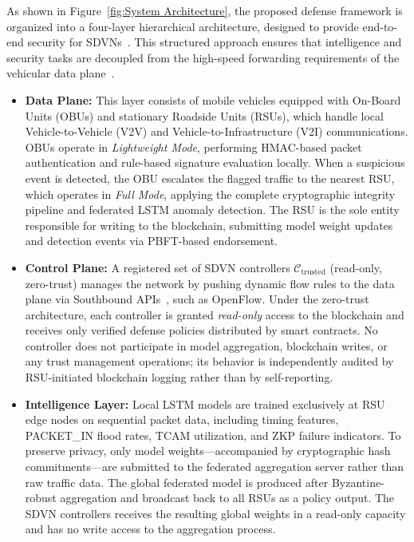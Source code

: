 \documentclass[12pt, a4paper]{report}
\begin{document}
As shown in Figure~\ref{fig:System Architecture}, the proposed defense framework 
is organized into a four-layer hierarchical architecture, designed to provide 
end-to-end security for SDVNs~\cite{Cardona_2020, s23031600}. This structured 
approach ensures that intelligence and security tasks are decoupled from the 
high-speed forwarding requirements of the vehicular data 
plane~\cite{PASCOAL2020107223}.

\begin{itemize}

\item \textbf{Data Plane:} This layer consists of mobile vehicles equipped with 
On-Board Units (OBUs) and stationary Roadside Units (RSUs), which handle local 
Vehicle-to-Vehicle (V2V) and Vehicle-to-Infrastructure (V2I) communications. OBUs 
operate in \textit{Lightweight Mode}, performing HMAC-based packet authentication 
and rule-based signature evaluation locally. When a suspicious event is detected, 
the OBU escalates the flagged traffic to the nearest RSU, which operates in 
\textit{Full Mode}, applying the complete cryptographic integrity pipeline and 
federated LSTM anomaly detection. The RSU is the sole entity responsible for 
writing to the blockchain, submitting model weight updates and detection events 
via PBFT-based endorsement.

\item \textbf{Control Plane:} A registered set of \ac{SDVN} controllers
$\mathcal{C}_{\mathrm{trusted}}$ (read-only, zero-trust) manages the
network by pushing dynamic flow rules to the data plane via Southbound 
APIs~\cite{8187644, 7981537}, such as OpenFlow. Under the zero-trust 
architecture, each controller is granted \textit{read-only} access to the 
blockchain and receives only verified defense policies distributed by smart 
contracts. No controller does not participate in model aggregation, blockchain 
writes, or any trust management operations; its behavior is independently audited 
by RSU-initiated blockchain logging rather than by self-reporting.

\item \textbf{Intelligence Layer:} Local LSTM models are trained exclusively at 
RSU edge nodes on sequential packet data, including timing features, PACKET\_IN 
flood rates, TCAM utilization, and ZKP failure indicators. To preserve privacy, 
only model weights---accompanied by cryptographic hash commitments---are submitted 
to the federated aggregation server rather than raw traffic data. The global 
federated model is produced after Byzantine-robust aggregation and broadcast back 
to all RSUs as a policy output. The SDVN controllers receives the resulting global 
weights in a read-only capacity and has no write access to the aggregation process.


\end{itemize}
\end{document}
